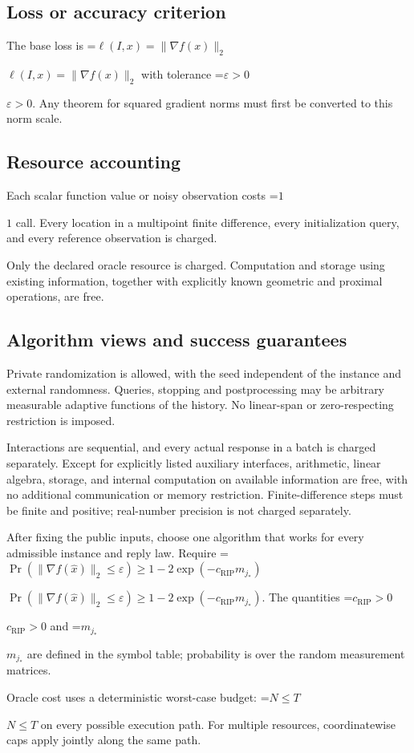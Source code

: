 \documentclass[10pt,a4paper]{article}
\newcommand{\AtlasMath}[1]{\par\begingroup\centering\setbox0=\hbox{$\displaystyle #1$}\ifdim\wd0>1.4\linewidth\typeout{ATLAS WIDE FORMULA: \the\wd0}\fi\ifdim\wd0>\linewidth\resizebox{\linewidth}{!}{\box0}\else\box0\fi\par\endgroup}
\newcommand{\AtlasInlineMath}[1]{\begingroup\setbox0=\hbox{$#1$}\ifdim\wd0>.4\linewidth\endgroup\AtlasMath{#1}\else\endgroup$#1$\fi}
\begin{document}
\subsection{Loss or accuracy criterion}
The base loss is \AtlasInlineMath{\ell(I,x)=\|\nabla f(x)\|_2} with tolerance \AtlasInlineMath{\varepsilon>0}. Any theorem for squared gradient norms must first be converted to this norm scale.

\subsection{Resource accounting}
Each scalar function value or noisy observation costs \AtlasInlineMath{1} call. Every location in a multipoint finite difference, every initialization query, and every reference observation is charged.

Only the declared oracle resource is charged. Computation and storage using existing information, together with explicitly known geometric and proximal operations, are free.

\subsection{Algorithm views and success guarantees}
Private randomization is allowed, with the seed independent of the instance and external randomness. Queries, stopping and postprocessing may be arbitrary measurable adaptive functions of the history. No linear-span or zero-respecting restriction is imposed.

Interactions are sequential, and every actual response in a batch is charged separately. Except for explicitly listed auxiliary interfaces, arithmetic, linear algebra, storage, and internal computation on available information are free, with no additional communication or memory restriction. Finite-difference steps must be finite and positive; real-number precision is not charged separately.

After fixing the public inputs, choose one algorithm that works for every admissible instance and reply law. Require \AtlasInlineMath{\Pr(\|\nabla f(\widehat{x})\|_2\le\varepsilon)\ge1-2\exp(-c_{\mathrm{RIP}}m_{j_*})}. The quantities \AtlasInlineMath{c_{\mathrm{RIP}}>0} and \AtlasInlineMath{m_{j_*}} are defined in the symbol table; probability is over the random measurement matrices.

Oracle cost uses a deterministic worst-case budget: \AtlasInlineMath{N\le T} on every possible execution path. For multiple resources, coordinatewise caps apply jointly along the same path.
\end{document}
